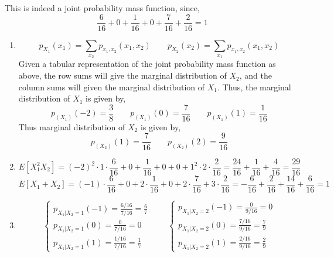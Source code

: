 \begin{solution}
This is indeed a joint probability mass function, since,
\[
    \frac{6}{16} + 0 + \frac{1}{16} + 0 + \frac{7}{16} + \frac{2}{16} = 1
\]
\begin{enumerate}[noitemsep, topsep=0em]
\item
\[
    p_{X_1}(x_1) = \sum_{x_2} p_{x_1, x_2}(x_1, x_2)
    \qquad
    p_{X_2}(x_2) = \sum_{x_1} p_{x_1, x_2}(x_1, x_2)
\]
Given a tabular representation of the joint probability mass function as above,
the row sums will give the marginal distribution of $X_2$, and the column sums
will given the marginal distribution of $X_1$. Thus, the marginal distribution
of $X_1$ is given by,
\[
    p_(X_1)(-2) = \frac{3}{8} \qquad
    p_(X_1)(0)  = \frac{7}{16}\qquad
    p_(X_1)(1)  = \frac{1}{16}
\]
Thus marginal distribution of $X_2$ is given by,
\[
    p_(X_2)(1) = \frac{7}{16} \qquad
    p_(X_2)(2) = \frac{9}{16}
\]
\item
\[
    E[X_1^2 X_2] = (-2)^2 \cdot 1 \cdot \frac{6}{16} + 
                   0 +
                   \frac{1}{16} +
                   0 +
                   0 +
                   1^2 \cdot 2 \cdot\frac{2}{16}
                 = \frac{24}{16} + \frac{1}{16} + \frac{4}{16}
                 = \frac{29}{16}
\]
\[
    E[X_1 + X_2] = (-1) \cdot \frac{6}{16} +
                   0 +
                   2 \cdot \frac{1}{16} +
                   0 +
                   2 \cdot \frac{7}{16} +
                   3 \cdot \frac{2}{16}
                 = -\frac{6}{16} + \frac{2}{16} + \frac{14}{16} + \frac{6}{16}
                 = 1
\]
\item
\[
    \begin{cases}
        p_{X_1 \vert X_2 = 1}(-1) = \frac{6 / 16}{7 / 16} = \frac{6}{7}      \\
        p_{X_1 \vert X_2 = 1}(0)  = \frac{0}{7 / 16} = 0                     \\
        p_{X_1 \vert X_2 = 1}(1)  = \frac{1 / 16}{7 / 16} = \frac{1}{7}
    \end{cases}
    \qquad
    \begin{cases}
        p_{X_1 \vert X_2 = 2}(-1) = \frac{0}{9 / 16} = 0                     \\
        p_{X_1 \vert X_2 = 2}(0)  = \frac{7 / 16}{9 / 16} = \frac{7}{9}      \\
        p_{X_1 \vert X_2 = 2}(1)  = \frac{2 / 16}{9 / 16} = \frac{2}{9}
    \end{cases}
\]
\end{enumerate}
\end{solution}

